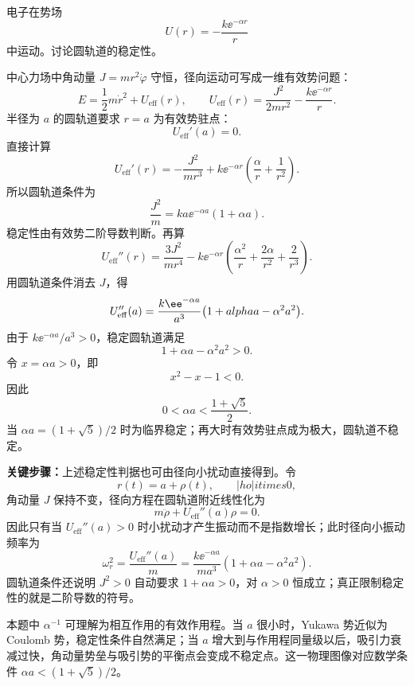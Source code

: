 \begin{question}[圆轨道稳定性]
电子在势场
\[
  U(r)=-\frac{k\ee^{-\alpha r}}{r}
\]
中运动。讨论圆轨道的稳定性。

\begin{solution}
中心力场中角动量 $J=mr^2\dot\varphi$ 守恒，径向运动可写成一维有效势问题：
\[
  E=\frac12m\dot r^2+U_{\mathrm{eff}}(r),
  \qquad
  U_{\mathrm{eff}}(r)=\frac{J^2}{2mr^2}-\frac{k\ee^{-\alpha r}}{r}.
\]
半径为 $a$ 的圆轨道要求 $r=a$ 为有效势驻点：
\[
  U_{\mathrm{eff}}'(a)=0.
\]
直接计算
\[
  U_{\mathrm{eff}}'(r)=-\frac{J^2}{mr^3}
  +k\ee^{-\alpha r}\left(\frac{\alpha}{r}+\frac1{r^2}\right).
\]
所以圆轨道条件为
\[
  \frac{J^2}{m}=ka\ee^{-\alpha a}(1+\alpha a).
\]
稳定性由有效势二阶导数判断。再算
\[
  U_{\mathrm{eff}}''(r)
  =\frac{3J^2}{mr^4}
  -k\ee^{-\alpha r}\left(\frac{\alpha^2}{r}+\frac{2\alpha}{r^2}+\frac2{r^3}\right).
\]
用圆轨道条件消去 $J$，得
\[
  U_{\mathrm{eff}}''(a)
  =\frac{k\ee^{-\alpha a}}{a^3}\bigl(1+\\alpha a-\alpha^2a^2\bigr).
\]
由于 $k\ee^{-\alpha a}/a^3>0$，稳定圆轨道满足
\[
  1+\alpha a-\alpha^2a^2>0.
\]
令 $x=\alpha a>0$，即
\[
  x^2-x-1<0.
\]
因此
\[
  \boxed{0<\alpha a<\frac{1+\sqrt5}{2}.}
\]
当 $\alpha a=(1+\sqrt5)/2$ 时为临界稳定；再大时有效势驻点成为极大，圆轨道不稳定。


\medskip
\textbf{关键步骤：}上述稳定性判据也可由径向小扰动直接得到。令
\[
  r(t)=a+\rho(t),\qquad |
ho|
itimes 0,
\]
角动量 $J$ 保持不变，径向方程在圆轨道附近线性化为
\[
  m\ddot\rho+U_{\mathrm{eff}}''(a)\rho=0.
\]
因此只有当 $U_{\mathrm{eff}}''(a)>0$ 时小扰动才产生振动而不是指数增长；此时径向小振动频率为
\[
  \omega_r^2=\frac{U_{\mathrm{eff}}''(a)}{m}
  =\frac{k\ee^{-\alpha a}}{ma^3}\left(1+\alpha a-\alpha^2a^2\right).
\]
圆轨道条件还说明 $J^2>0$ 自动要求 $1+\alpha a>0$，对 $\alpha>0$ 恒成立；真正限制稳定性的就是二阶导数的符号。


\medskip
本题中 $\alpha^{-1}$ 可理解为相互作用的有效作用程。当 $a$ 很小时，Yukawa 势近似为 Coulomb 势，稳定性条件自然满足；当 $a$ 增大到与作用程同量级以后，吸引力衰减过快，角动量势垒与吸引势的平衡点会变成不稳定点。这一物理图像对应数学条件 $\alpha a<(1+\sqrt5)/2$。
\end{solution}
\end{question}


